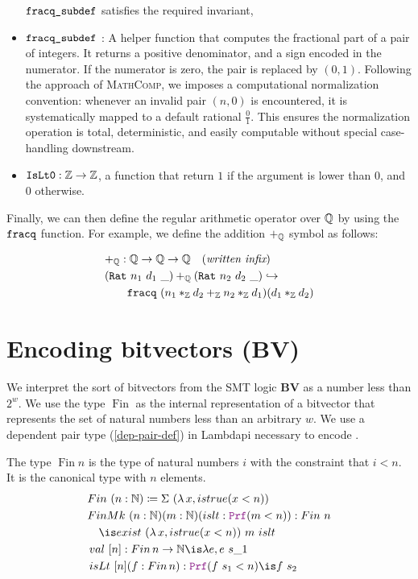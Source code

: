 \begin{definition}
\begin{itemize}
  $\texttt{\upshape{fracq\_subdef}}$ satisfies the required invariant,
\item $\texttt{\upshape{fracq\_subdef}}$ : A helper function that computes the fractional part of a pair of integers.
It returns a positive denominator, and a sign encoded in the numerator. If the numerator is zero, the pair is replaced by $(0, 1)$.
Following the approach of \textsc{MathComp}, we imposes a computational normalization convention: whenever an invalid pair $(n, 0)$ is encountered, it is systematically mapped to a default rational $\frac{0}{1}$.
This ensures the normalization operation is total, deterministic, and easily computable without special case-handling downstream.

\item $\texttt{\upshape{IsLt0}}: \mathbb{Z} \rightarrow \mathbb{Z}$, a function that return $1$ if the argument is lower than $0$, and $0$ otherwise.
\end{itemize}
\end{definition}

Finally, we can then define the regular arithmetic operator over $\mathbb{Q}$ by using the $\texttt{\upshape{fracq}}$ function.
For example, we define the addition $+_{\mathbb{Q}}$ symbol as follows:

\begin{align*}
&+_{\mathbb{Q}} : \mathbb{Q} \rightarrow \mathbb{Q} \rightarrow \mathbb{Q} \quad (\textit{written infix})\\
&(\texttt{\upshape{Rat}}~n_1~d_1~\_) +_{\mathbb{Q}} (\texttt{\upshape{Rat}}~n_2~d_2~\_) \hookrightarrow\\
&\qquad \texttt{\upshape{fracq}}~(n_1 *_{\mathbb{Z}} d_2 +_{\mathbb{Z}} n_2 *_{\mathbb{Z}} d_1) (d_1 *_{\mathbb{Z}} d_2) \\
\end{align*}


\section{Encoding bitvectors (\textbf{\uppercase{BV}})}
\label{ssec:encoding-bv}

We interpret the sort of bitvectors  from the SMT logic \textbf{BV} as a number less than $2^w$. We use the type $\mathop{Fin}$ as the internal representation of a bitvector
that represents the set of natural numbers less than an arbitrary $w$. We use a dependent pair type (\cref{dep-pair-def}) in Lambdapi necessary to encode .

\begin{definition}[Fin]\label{def:fin-def}
The type $\mathop{Fin} n$ is the type of natural numbers $i$ with the constraint that $i < n$.
It is the canonical type with $n$ elements.
\begin{align*}
& Fin~(n: \N) \coloneq \Sigma~(\lambda\,x, istrue(x < n)) \\
& FinMk~(n: \N) (m: \N) (islt: \prf (m < n)) : Fin~n \\
&\quad\is exist~(\lambda\,x, istrue(x <n))~m~islt\\
&\mathop{val}~[n]: \mathop{Fin} n \ra \N \is \lambda e, e~s\_1 \\
&\mathop{isLt}~[n] (f: \mathop{Fin} n): \prf (f~s_1 < n) \is f~s_2\\
\end{align*}
\end{definition}

